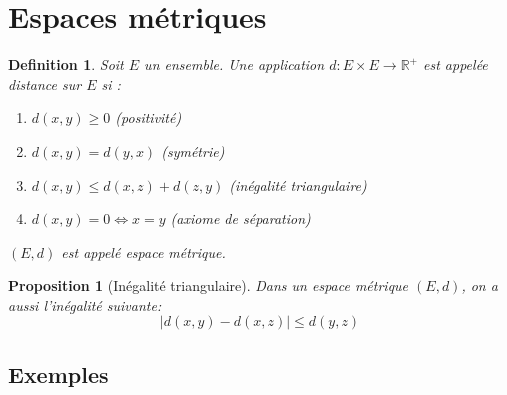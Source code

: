 \documentclass{article}
\newtheorem{proposition}{Proposition}
\newtheorem{definition}{Definition}
\begin{document}
\sloppy

\section{Espaces métriques}

\begin{definition}
Soit $E$ un ensemble. Une application $d : E \times E \to \mathbb{R}^+$ est appelée distance sur $E$ si :
\begin{enumerate}
    \item $d(x, y) \geq 0$ (positivité)
    \item $d(x, y) = d(y, x)$ (symétrie)
    \item $d(x, y) \leq d(x, z) + d(z, y)$ (inégalité triangulaire)
    \item $d(x, y) = 0 \Leftrightarrow x = y$ (axiome de séparation)
\end{enumerate}
$(E, d)$ est appelé espace métrique.
\end{definition}

\begin{proposition}
[Inégalité triangulaire]
Dans un espace métrique $(E, d)$, on a aussi l'inégalité suivante:
\[
|d(x, y) - d(x, z)| \leq d(y, z)
\]
\end{proposition}

\subsection{Exemples}
\end{document}
